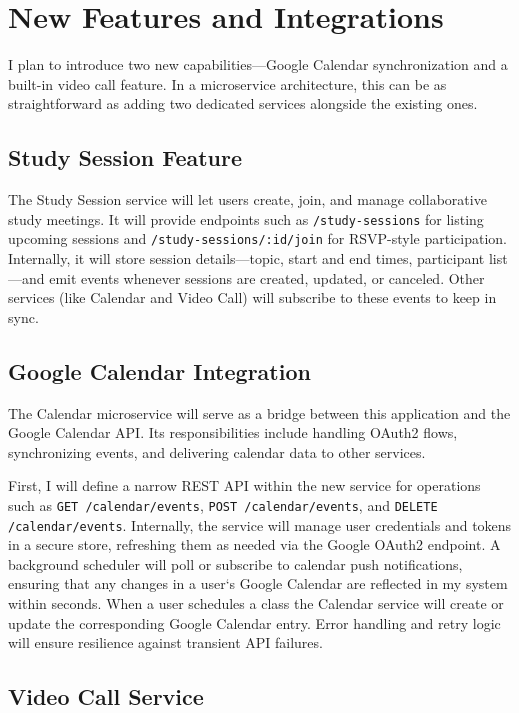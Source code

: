 \section{New Features and Integrations}

I plan to introduce two new capabilities—Google Calendar synchronization and a built-in video call feature.  In a microservice architecture, this can be as straightforward as adding two dedicated services alongside the existing ones.

\subsection{Study Session Feature}

The Study Session service will let users create, join, and manage collaborative study meetings. It will provide endpoints such as \texttt{/study-sessions} for listing upcoming sessions and \texttt{/study-sessions/:id/join} for RSVP-style participation. Internally, it will store session details—topic, start and end times, participant list—and emit events whenever sessions are created, updated, or canceled. Other services (like Calendar and Video Call) will subscribe to these events to keep in sync.

\subsection{Google Calendar Integration}

The Calendar microservice will serve as a bridge between this application and the Google Calendar API.  Its responsibilities include handling OAuth2 flows, synchronizing events, and delivering calendar data to other services.

First, I will define a narrow REST API within the new service for operations such as \texttt{GET /calendar/events}, \texttt{POST /calendar/events}, and \texttt{DELETE /calendar/events}.  Internally, the service will manage user credentials and tokens in a secure store, refreshing them as needed via the Google OAuth2 endpoint.  A background scheduler will poll or subscribe to calendar push notifications, ensuring that any changes in a user`s Google Calendar are reflected in my system within seconds.  When a user schedules a class the Calendar service will create or update the corresponding Google Calendar entry.  Error handling and retry logic will ensure resilience against transient API failures.

\subsection{Video Call Service}

